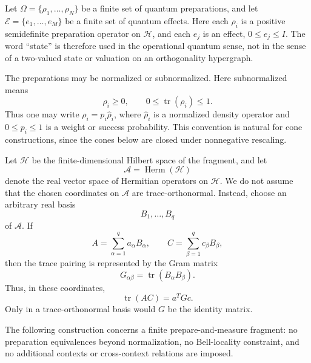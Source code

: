 \documentclass[aps,pra,twocolumn,superscriptaddress,nofootinbib]{revtex4-2}
\newcommand{\E}{\mathcal{E}}
\newcommand{\HH}{\mathcal{H}}
\newcommand{\OmegaSet}{\Omega}
\newcommand{\tr}{\operatorname{tr}}
\begin{document}
Let $\OmegaSet=\{\rho_1,\ldots,\rho_N\}$ be a finite set of quantum
preparations, and let $\E=\{e_1,\ldots,e_M\}$ be a finite set of quantum
effects.  Here each $\rho_i$ is a positive semidefinite preparation operator
on $\HH$, and each $e_j$ is an effect, $0\le e_j\le I$.  The word
``state'' is therefore used in the operational quantum sense, not in the
sense of a two-valued state or valuation on an orthogonality hypergraph.

The preparations may be normalized or subnormalized.  Here subnormalized
means
\begin{equation}
        \rho_i\ge 0,
        \qquad
        0\le \tr(\rho_i)\le 1.
\end{equation}
Thus one may write $\rho_i=p_i\widehat{\rho}_i$, where
$\widehat{\rho}_i$ is a normalized density operator and
$0\le p_i\le 1$ is a weight or success probability.  This convention is
natural for cone constructions, since the cones below are closed under
nonnegative rescaling.

Let \(\HH\) be the finite-dimensional Hilbert space of the fragment, and let
\begin{equation}
        \mathcal A=\operatorname{Herm}(\HH)
\end{equation}
denote the real vector space of Hermitian operators on $\HH$.  We do not
assume that the chosen coordinates on $\mathcal A$ are trace-orthonormal.
Instead, choose an arbitrary real basis
\begin{equation}
        B_1,\ldots,B_q
\end{equation}
of $\mathcal A$.  If
\begin{equation}
        A=\sum_{\alpha=1}^q a_\alpha B_\alpha,
        \qquad
        C=\sum_{\beta=1}^q c_\beta B_\beta,
\end{equation}
then the trace pairing is represented by the Gram matrix
\begin{equation}
        G_{\alpha\beta}=\tr(B_\alpha B_\beta).
        \label{eq:trace-gram-matrix}
\end{equation}
Thus, in these coordinates,
\begin{equation}
        \tr(AC)=a^T G c.
        \label{eq:trace-pairing-coordinate}
\end{equation}
Only in a trace-orthonormal basis would $G$ be the identity matrix.

The following construction concerns a finite prepare-and-measure
fragment: no preparation equivalences beyond normalization, no Bell-locality
constraint, and no additional contexts or cross-context relations are imposed.
\end{document}

